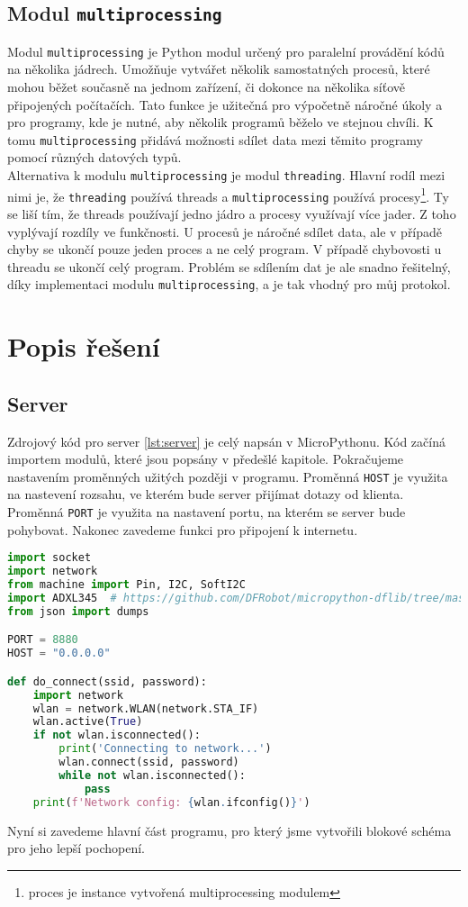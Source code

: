 \documentclass[12pt]{report}			%
\begin{document}
\subsection{Modul \texttt{multiprocessing}}
Modul \texttt{multiprocessing} je Python modul určený pro paralelní provádění kódů na několika jádrech. Umožňuje vytvářet několik samostatných procesů, které mohou běžet současně na jednom zařízení, či dokonce na několika síťově připojených počítačích. Tato funkce je užitečná pro výpočetně náročné úkoly a pro programy, kde je nutné, aby několik programů běželo ve stejnou chvíli. K tomu \texttt{multiprocessing} přidává možnosti sdílet data mezi těmito programy pomocí různých datových typů. \cite{multiprocess}
\\
Alternativa k modulu \texttt{multiprocessing} je modul \texttt{threading}. Hlavní rodíl mezi nimi je, že \texttt{threading} používá threads a \texttt{multiprocessing} používá procesy\footnote{proces je instance vytvořená multiprocessing modulem}. Ty se liší tím, že threads používají jedno jádro a procesy využívají více jader. Z toho vyplývají rozdíly ve funkčnosti. U procesů je náročné sdílet data, ale v případě chyby se ukončí pouze jeden proces a ne celý program. V případě chybovosti u threadu se ukončí celý program. Problém se sdílením dat je ale snadno řešitelný, díky implementaci modulu \texttt{multiprocessing}, a je tak vhodný pro můj protokol. \cite{threading}


\section{Popis řešení}
\subsection{Server}
Zdrojový kód pro server \ref{lst:server} je celý napsán v MicroPythonu. Kód začíná importem modulů, které jsou popsány v předešlé kapitole. Pokračujeme nastavením proměnných užitých později v programu. Proměnná \texttt{HOST} je využita na nastevení rozsahu, ve kterém bude server přijímat dotazy od klienta. Proměnná \texttt{PORT} je využita na nastavení portu, na kterém se server bude pohybovat. Nakonec zavedeme funkci pro připojení k internetu.
\begin{lstlisting}[title={Program server.py}, caption={server.py}, language=Python]
import socket
import network
from machine import Pin, I2C, SoftI2C
import ADXL345  # https://github.com/DFRobot/micropython-dflib/tree/master/ADXL345
from json import dumps

PORT = 8880
HOST = "0.0.0.0"

def do_connect(ssid, password):
    import network
    wlan = network.WLAN(network.STA_IF)
    wlan.active(True)
    if not wlan.isconnected():
        print('Connecting to network...')
        wlan.connect(ssid, password)
        while not wlan.isconnected():
            pass
    print(f'Network config: {wlan.ifconfig()}')

\end{lstlisting}
Nyní si zavedeme hlavní část programu, pro který jsme vytvořili blokové schéma pro jeho lepší pochopení. 
\end{document}
